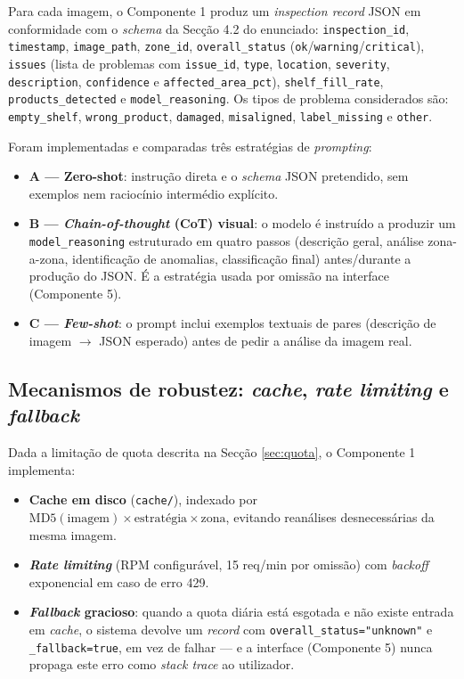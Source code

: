 \documentclass[conference]{IEEEtran}
\begin{document}
Para cada imagem, o Componente 1 produz um \textit{inspection record} JSON
em conformidade com o \textit{schema} da Secção 4.2 do enunciado:
\texttt{inspection\_id}, \texttt{timestamp}, \texttt{image\_path},
\texttt{zone\_id}, \texttt{overall\_status}
(\texttt{ok}/\texttt{warning}/\texttt{critical}), \texttt{issues} (lista de
problemas com \texttt{issue\_id}, \texttt{type}, \texttt{location},
\texttt{severity}, \texttt{description}, \texttt{confidence} e
\texttt{affected\_area\_pct}), \texttt{shelf\_fill\_rate},
\texttt{products\_detected} e \texttt{model\_reasoning}. Os tipos de
problema considerados são: \texttt{empty\_shelf}, \texttt{wrong\_product},
\texttt{damaged}, \texttt{misaligned}, \texttt{label\_missing} e
\texttt{other}.

Foram implementadas e comparadas três estratégias de \textit{prompting}:

\begin{itemize}
  \item \textbf{A --- Zero-shot}: instrução direta e o \textit{schema} JSON
  pretendido, sem exemplos nem raciocínio intermédio explícito.
  \item \textbf{B --- \textit{Chain-of-thought} (CoT) visual}: o modelo é
  instruído a produzir um \texttt{model\_reasoning} estruturado em quatro
  passos (descrição geral, análise zona-a-zona, identificação de anomalias,
  classificação final) antes/durante a produção do JSON. É a estratégia
  usada por omissão na interface (Componente 5).
  \item \textbf{C --- \textit{Few-shot}}: o prompt inclui exemplos textuais
  de pares (descrição de imagem $\rightarrow$ JSON esperado) antes de pedir
  a análise da imagem real.
\end{itemize}

\subsection{Mecanismos de robustez: \textit{cache}, \textit{rate limiting} e \textit{fallback}}

Dada a limitação de quota descrita na Secção \ref{sec:quota}, o Componente 1
implementa:

\begin{itemize}
  \item \textbf{Cache em disco} (\texttt{cache/}), indexado por
  $\text{MD5}(\text{imagem}) \times \text{estratégia} \times \text{zona}$,
  evitando reanálises desnecessárias da mesma imagem.
  \item \textbf{\textit{Rate limiting}} (RPM configurável, 15 req/min por
  omissão) com \textit{backoff} exponencial em caso de erro 429.
  \item \textbf{\textit{Fallback} gracioso}: quando a quota diária está
  esgotada e não existe entrada em \textit{cache}, o sistema devolve um
  \textit{record} com \texttt{overall\_status="unknown"} e
  \texttt{\_fallback=true}, em vez de falhar --- e a interface (Componente
  5) nunca propaga este erro como \textit{stack trace} ao utilizador.
\end{itemize}
\end{document}
